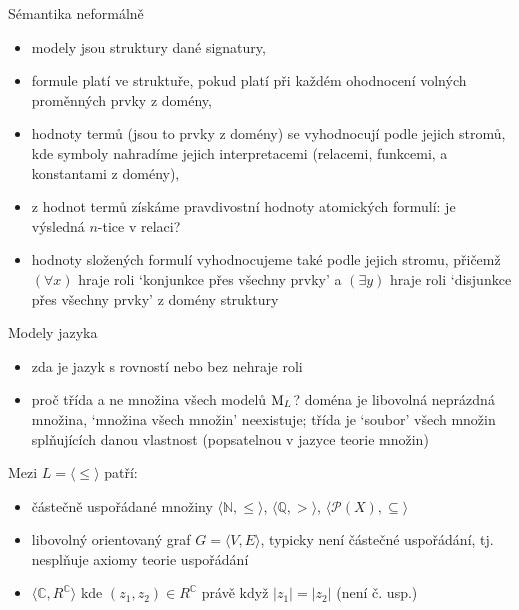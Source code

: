 \documentclass{beamer}
\begin{document}
\begin{frame}{Sémantika neformálně}

    \begin{itemize}
        \item \alert{modely jsou struktury} dané signatury,
        \item formule \alert{platí} ve struktuře, pokud platí při každém ohodnocení volných proměnných prvky z domény,
        \item \alert{hodnoty termů} (jsou to prvky z domény) se vyhodnocují podle jejich stromů, kde symboly nahradíme jejich interpretacemi (relacemi, funkcemi, a konstantami z domény),
        \item z hodnot termů získáme \alert{pravdivostní hodnoty atomických formulí}: je výsledná $n$-tice v relaci?
        \item hodnoty složených formulí vyhodnocujeme také podle jejich stromu, přičemž \alert{$(\forall x)$ hraje roli `konjunkce přes všechny prvky'} a  \alert{$(\exists y)$ hraje roli `disjunkce přes všechny prvky'} z domény struktury
    \end{itemize}    

\end{frame}


\begin{frame}{Modely jazyka}

    \medskip


    \begin{itemize}
        \item zda je jazyk s rovností nebo bez nehraje roli
        \item proč \alert{třída} a ne \alert{množina} všech modelů $\operatorname{M}_L$? doména je libovolná neprázdná množina, `množina všech množin' neexistuje; třída je \alert{`soubor'} všech množin splňujících danou vlastnost (popsatelnou v \alert{jazyce teorie množin})
    \end{itemize}
    
    Mezi  $L=\langle \leq \rangle$ patří: \begin{itemize}
        \item částečně uspořádané množiny $\langle \mathbb N,\leq\rangle$, $\langle \mathbb Q, > \rangle$, $\langle\mathcal P(X),\subseteq\rangle$
        \item libovolný orientovaný graf $G=\langle V,E\rangle$, typicky není částečné uspořádání, tj. nesplňuje axiomy \alert{teorie uspořádání}
        \item $\langle \mathbb C,R^\mathbb C\rangle$ kde $(z_1,z_2)\in R^\mathbb C$ právě když $|z_1|=|z_2|$ (není č. usp.)
    \end{itemize}

\end{frame}
\end{document}
